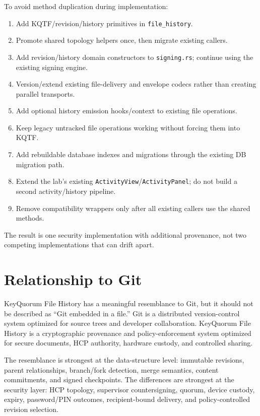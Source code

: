\documentclass[11pt]{article}
\begin{document}
To avoid method duplication during implementation:

\begin{enumerate}[leftmargin=1.8em]
  \item Add KQTF/revision/history primitives in \texttt{file\_history}.
  \item Promote shared topology helpers once, then migrate existing callers.
  \item Add revision/history domain constructors to \texttt{signing.rs}; continue using the existing signing engine.
  \item Version/extend existing file-delivery and envelope codecs rather than creating parallel transports.
  \item Add optional history emission hooks/context to existing file operations.
  \item Keep legacy untracked file operations working without forcing them into KQTF.
  \item Add rebuildable database indexes and migrations through the existing DB migration path.
  \item Extend the lab's existing \texttt{ActivityView}/\texttt{ActivityPanel}; do not build a second activity/history pipeline.
  \item Remove compatibility wrappers only after all existing callers use the shared methods.
\end{enumerate}

The result is one security implementation with additional provenance, not two competing implementations that can drift apart.



\section{Relationship to Git}
KeyQuorum File History has a meaningful resemblance to Git, but it should not be described as ``Git embedded in a file.'' Git is a distributed version-control system optimized for source trees and developer collaboration. KeyQuorum File History is a cryptographic provenance and policy-enforcement system optimized for secure documents, HCP authority, hardware custody, and controlled sharing.

The resemblance is strongest at the data-structure level: immutable revisions, parent relationships, branch/fork detection, merge semantics, content commitments, and signed checkpoints. The differences are strongest at the security layer: HCP topology, supervisor countersigning, quorum, device custody, expiry, password/PIN outcomes, recipient-bound delivery, and policy-controlled revision selection.
\end{document}
